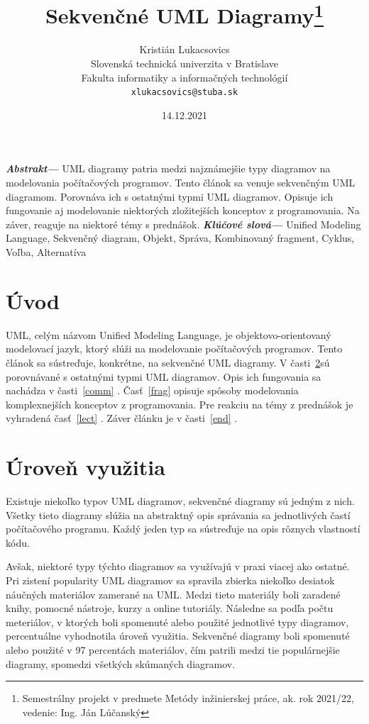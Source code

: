 \documentclass[10pt,slovak,a4paper]{article}
\title{Sekvenčné UML Diagramy\thanks{Semestrálny projekt v predmete Metódy inžinierskej práce, ak. rok 2021/22, vedenie: Ing. Ján Lúčanský}}
\author{Kristián Lukacsovics\\[2pt]
    {\small Slovenská technická univerzita v Bratislave}\\
    {\small Fakulta informatiky a informačných technológií}\\
    {\small \texttt{xlukacsovics@stuba.sk}}
    }
\date{\small 14.12.2021}
\providecommand{\abstr}[1]{\textbf{\textit{Abstrakt---}} #1}
\providecommand{\keywords}[1]{\textbf{\textit{Klúčové slová---}} #1}
\begin{document}
\maketitle

\abstr{UML diagramy patria medzi najznámejšie typy diagramov na modelovania počítačových programov. 
Tento článok sa venuje sekvenčným UML diagramom. Porovnáva ich s ostatnými typmi UML diagramov. Opisuje ich fungovanie aj modelovanie niektorých zložitejších konceptov z programovania. 
Na záver, reaguje na niektoré témy s prednášok. \newline}
\indent\keywords{Unified Modeling Language, Sekvenčný diagram, Objekt, Správa, Kombinovaný fragment, Cyklus, Voľba, Alternatíva}

\section{Úvod}
UML, celým názvom Unified Modeling Language, je objektovo-orientovaný modelovací jazyk, ktorý slúži na modelovanie počítačových programov. \cite{eriksson98}
Tento článok sa sústreďuje, konkrétne, na sekvenčné UML diagramy. 
V časti~\ref{usage}sú porovnávané s ostatnými typmi UML diagramov.
Opis ich fungovania sa nachádza v časti~\ref{comm} .
Časť~\ref{frag} opisuje spôsoby modelovania komplexnejších konceptov z programovania.
Pre reakciu na témy z prednášok je vyhradená časť~\ref{lect} .
Záver článku je v časti~\ref{end} .

\section{Úroveň využitia} \label{usage}
Existuje niekoľko typov UML diagramov, sekvenčné diagramy sú jedným z nich. Všetky tieto diagramy slúžia na
abstraktný opis správania sa jednotlivých častí počítačového programu. Každý jeden typ sa sústreďuje na opis
rôznych vlastností kódu. \cite{petraq14} \newline

\noindent Avšak, niektoré typy týchto diagramov sa využívajú v praxi viacej ako ostatné. Pri zistení popularity UML diagramov sa spravila zbierka niekoľko desiatok náučných
materiálov zamerané na UML. Medzi tieto materiály boli zaradené knihy, pomocné nástroje, kurzy a online tutoriály. Následne sa podľa počtu meteriálov, v ktorých boli spomenuté alebo použité
jednotlivé typy diagramov, percentuálne vyhodnotila úroveň využitia. Sekvenčné diagramy boli spomenuté alebo použité v 97 percentách materiálov, čím patrili medzi tie populárnejšie diagramy, spomedzi všetkých skúmaných diagramov. \cite{reggio13} \newline
\end{document}
